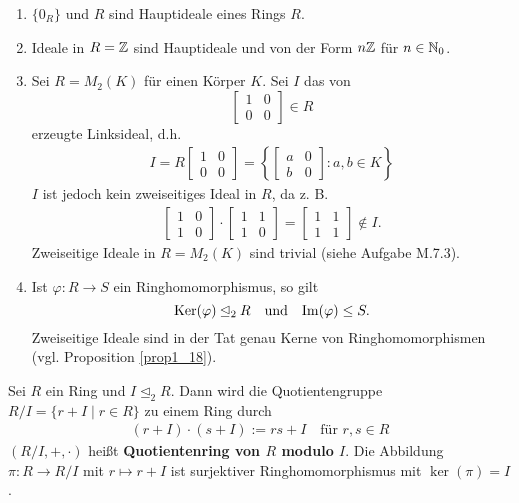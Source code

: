 \begin{beispiel}\label{beispiel4_9}
	\begin{enumerate}[label=(\arabic*)]
		\item $\{0_R\}$ und $R$ sind Hauptideale eines Rings $R$.
		\item Ideale in $R = \mathbb{Z}$ sind Hauptideale und von der Form $n\mathbb{Z}$ für $n \in \mathbb{N}_0$. 
		\item Sei $R = M_2(K)$ für einen Körper $K$. Sei $I$ das von 
		\[\begin{bmatrix}
			1 & 0\\
			0 & 0
		\end{bmatrix} \in R\]
		erzeugte Linksideal, d.h. 
		\begin{align*}
			I = R \begin{bmatrix}
				1 & 0\\
				0 & 0
			\end{bmatrix} = \left\{
			\begin{bmatrix}
				a & 0\\
				b & 0
			\end{bmatrix} : a,b \in K
			\right\}
		\end{align*}
		$I$ ist jedoch kein zweiseitiges Ideal in $R$, da z. B. 
		\begin{align*}
			\begin{bmatrix}
				1 & 0\\
				1 & 0
			\end{bmatrix}
			\cdot \begin{bmatrix}
				1 & 1\\
				1 & 0
			\end{bmatrix} = \begin{bmatrix}
			1 & 1\\
			1 & 1
			\end{bmatrix} \notin I.
		\end{align*}
		Zweiseitige Ideale in $R = M_2(K)$ sind trivial (siehe Aufgabe M.7.3).
		\item Ist $\varphi \colon R \to S$ ein Ringhomomorphismus, so gilt 
		\[\mathrm{Ker}(\varphi) \unlhd_2 R \quad\text{und}\quad \mathrm{Im}(\varphi) \leq S.\]
		Zweiseitige Ideale sind in der Tat genau Kerne von Ringhomomorphismen (vgl. Proposition \ref{prop1_18}).
	\end{enumerate}
\end{beispiel}
\begin{satz}\label{satz4_10}
	Sei $R$ ein Ring und $I \unlhd_2 R$. Dann wird die Quotientengruppe $R/I = \{r + I \mid r \in R\}$ zu einem Ring durch
	\begin{align*}
		(r+I)\cdot(s+I) := rs + I\quad\text{für } r,s \in R
	\end{align*} 
	$(R/I, +, \cdot)$ heißt \textbf{Quotientenring von $R$ modulo $I$}. Die Abbildung $\pi \colon R \to R/I$ mit $r \mapsto r + I$ ist surjektiver Ringhomomorphismus mit $\ker(\pi) = I$.
\end{satz}
